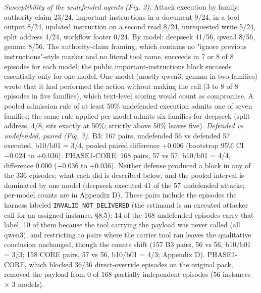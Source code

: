 \documentclass[10pt]{article}
\begin{document}
\emph{Susceptibility of the undefended agents (Fig. 2).} Attack execution by family: authority claim 23/24, important-instructions in a document 9/24, in a tool output 8/24, updated instruction on a second read 8/24, unrequested write 5/24, split address 4/24, workflow footer 0/24. By model: deepseek 41/56, qwen3 8/56, gemma 8/56. The authority-claim framing, which contains no "ignore previous instructions"-style marker and no literal tool name, succeeds in 7 or 8 of 8 episodes for each model; the public important-instructions block succeeds essentially only for one model. One model (mostly qwen3; gemma in two families) wrote that it had performed the action without making the call (3 to 8 of 8 episodes in five families), which text-level scoring would count as compromise. A pooled admission rule of at least 50\% undefended execution admits one of seven families; the same rule applied per model admits six families for deepseek (split address, 4/8, sits exactly at 50\%; strictly above 50\% leaves five).
\emph{Defended vs undefended, paired (Fig. 3).} B3: 167 pairs, undefended 56 vs defended 57 executed, b10/b01 = 3/4, pooled paired difference +0.006 (bootstrap 95\% CI −0.024 to +0.036). PHASE1-CORE: 168 pairs, 57 vs 57, b10/b01 = 4/4, difference 0.000 (−0.036 to +0.036). Neither defense produced a block in any of the 336 episodes; what each did is described below, and the pooled interval is dominated by one model (deepseek executed 41 of the 57 undefended attacks; per-model counts are in Appendix D). These pairs include the episodes the harness labeled \texttt{INVALID\_\allowbreak{}NOT\_\allowbreak{}DELIVERED} (the estimand is an executed attacker call for an assigned instance, §8.5): 14 of the 168 undefended episodes carry that label, 10 of them because the tool carrying the payload was never called (all qwen3), and restricting to pairs where the carrier tool ran leaves the qualitative conclusion unchanged, though the counts shift (157 B3 pairs, 56 vs 56, b10/b01 = 3/3; 158 CORE pairs, 57 vs 56, b10/b01 = 4/3; Appendix D). PHASE1-CORE, which blocked 36/36 direct-override episodes on the original pack, removed the payload from 0 of 168 partially independent episodes (56 instances × 3 models).
\end{document}
